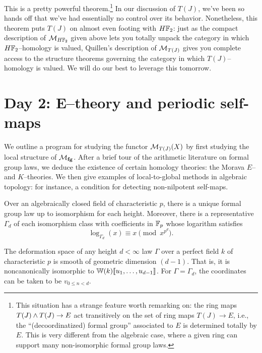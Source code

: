 This is a pretty powerful theorem.\footnote{This situation has a strange feature worth remarking on: the ring maps $T(J) \wedge T(J) \to E$ act transitively on the set of ring maps $T(J) \to E$, i.e., the ``(decoordinatized) formal group'' associated to $E$ is determined totally by $E$.  This is very different from the algebraic case, where a given ring can support many non-isomorphic formal group laws.}  In our discussion of $T(J)$, we've been so hands off that we've had essentially no control over its behavior.  Nonetheless, this theorem puts $T(J)$ on almost even footing with $H\mathbb F_2$: just as the compact description of $\mathcal{M}_{H\mathbb F_2}$ given above lets you totally unpack the category in which $H\mathbb F_2$--homology is valued, Quillen's description of $\mathcal{M}_{T(J)}$ gives you complete access to the structure theorems governing the category in which $T(J)$--homology is valued.  We will do our best to leverage this tomorrow.













\newpage
\section*{Day 2: E--theory and periodic self-maps}


We outline a program for studying the functor $\mathcal{M}_{T(J)}(X)$ by first studying the local structure of $\mathcal{M}_{\mathbf{fg}}$.  After a brief tour of the arithmetic literature on formal group laws, we deduce the existence of certain homology theories: the Morava $E$-- and $K$--theories.  We then give examples of local-to-global methods in algebraic topology: for instance, a condition for detecting non-nilpotent self-maps.




\begin{theorem}
Over an algebraically closed field of characteristic $p$, there is a unique formal group law up to isomorphism for each height.  Moreover, there is a representative $\Gamma_d$ of each isomorphism class with coefficients in $\mathbb F_p$ whose logarithm satisfies \[\log_{\Gamma_d}(x) \equiv x \pmod{x^{p^d}}.\]
\end{theorem}

\begin{theorem}
The deformation space of any height $d < \infty$ law $\Gamma$ over a perfect field $k$ of characteristic $p$ is smooth of geometric dimension $(d-1)$.  That is, it is noncanonically isomorphic to $\mathbb W(k)\llbracket{u_1, \ldots, u_{d-1}}\rrbracket$.  For $\Gamma = \Gamma_d$, the coordinates can be taken to be $v_{0 \le n < d}$.
\end{theorem}

